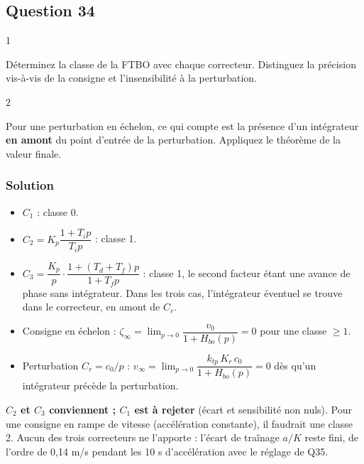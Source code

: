 \documentclass[11pt,a4paper]{article}
\begin{document}
\hypertarget{question-34}{%
\subsection{Question 34}\label{question-34}}

\begin{indication}{1}

Déterminez la classe de la FTBO avec chaque correcteur. Distinguez la précision vis-à-vis de la consigne et l'insensibilité à la perturbation.

\end{indication}

\begin{indication}{2}

Pour une perturbation en échelon, ce qui compte est la présence d'un intégrateur \textbf{en amont} du point d'entrée de la perturbation. Appliquez le théorème de la valeur finale.

\end{indication}

\hypertarget{solution-33}{%
\subsubsection{Solution}\label{solution-33}}

\begin{itemize}
\item
  \(C_1\) : classe 0.
\item
  \(C_2=K_p\dfrac{1+T_ip}{T_ip}\) : classe 1.
\item
  \(C_3=\dfrac{K_p}p\cdot\dfrac{1+(T_d+T_f)p}{1+T_fp}\) : classe 1, le second facteur étant une avance de phase sans intégrateur. Dans les trois cas, l'intégrateur éventuel se trouve dans le correcteur, en amont de \(C_r\).
\item
  Consigne en échelon : \(\zeta_\infty=\lim_{p\to0}\dfrac{v_0}{1+H_{bo}(p)}=0\) pour une classe \(\geqslant1\).
\item
  Perturbation \(C_r=c_0/p\) : \(v_\infty=\lim_{p\to0}\dfrac{k_{tp}\,K_r\,c_0}{1+H_{bo}(p)}=0\) dès qu'un intégrateur précède la perturbation.
\end{itemize}

\textbf{\(C_2\) et \(C_3\) conviennent ; \(C_1\) est à rejeter} (écart et sensibilité non nuls). Pour une consigne en rampe de vitesse (accélération constante), il faudrait une classe 2. Aucun des trois correcteurs ne l'apporte : l'écart de traînage \(a/K\) reste fini, de l'ordre de 0,14 m/s pendant les 10 s d'accélération avec le réglage de Q35.
\end{document}
